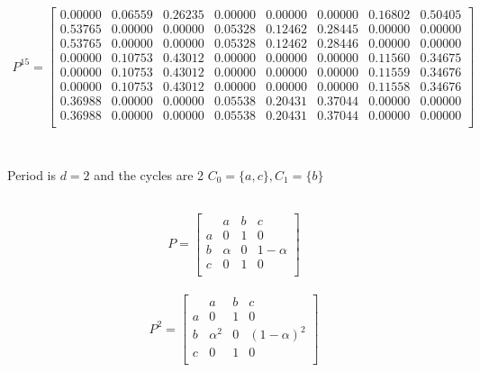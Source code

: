 \documentclass[12pt, a4paper]{article}
\begin{document}
\begin{align*}
  P^{15} = \begin{bmatrix}
   0.00000 &  0.06559 &  0.26235 &  0.00000 &  0.00000 &  0.00000 &  0.16802 &  0.50405\\
   0.53765 &  0.00000 &  0.00000 &  0.05328 &  0.12462 &  0.28445 &  0.00000 &  0.00000\\
   0.53765 &  0.00000 &  0.00000 &  0.05328 &  0.12462 &  0.28446 &  0.00000 &  0.00000\\
   0.00000 &  0.10753 &  0.43012 &  0.00000 &  0.00000 &  0.00000 &  0.11560 &  0.34675\\
   0.00000 &  0.10753 &  0.43012 &  0.00000 &  0.00000 &  0.00000 &  0.11559 &  0.34676\\
   0.00000 &  0.10753 &  0.43012 &  0.00000 &  0.00000 &  0.00000 &  0.11558 &  0.34676\\
   0.36988 &  0.00000 &  0.00000 &  0.05538 &  0.20431 &  0.37044 &  0.00000 &  0.00000\\
   0.36988 &  0.00000 &  0.00000 &  0.05538 &  0.20431 &  0.37044 &  0.00000 &  0.00000\\
\end{bmatrix}
\end{align*}

\section{}
\subsection{}
Period is $d=2$ and the cycles are 2 $C_0 = \{a,c\}, C_1=\{b\}$

\subsection{}
\begin{align*}
  P = \begin{bmatrix}
       & a & b & c\\
     a & 0 & 1 & 0 \\
     b & \alpha & 0 & 1-\alpha \\
     c & 0 & 1 & 0 \\
  \end{bmatrix}
\end{align*}


\begin{align*}
  P^2 = \begin{bmatrix}
       & a & b & c\\
     a & 0 & 1 & 0 \\
     b & \alpha^2 & 0 & (1-\alpha)^2 \\
     c & 0 & 1 & 0 \\
  \end{bmatrix}
\end{align*}
\end{document}
